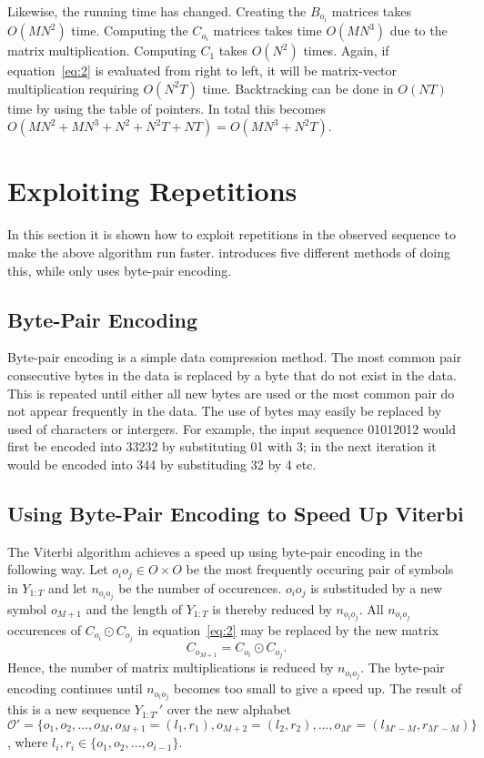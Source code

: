 Likewise, the running time has changed. Creating the $B_{o_i}$ matrices takes
$O(M N^2)$ time. Computing the $C_{o_i}$ matrices takes time $O(M N^3)$ due to
the matrix multiplication. Computing $C_1$ takes $O(N^2)$ times. Again, if
equation~\eqref{eq:2} is evaluated from right to left, it will be matrix-vector
multiplication requiring $O(N^2 T)$ time. Backtracking can be done in $O(NT)$
time by using the table of pointers. In total this becomes $O(M N^2 + M N^3 +
N^2 + N^2 T + NT) = O(M N^3 + N^2 T)$.

\section{Exploiting Repetitions}
\label{sec:expl-repet}

In this section it is shown how to exploit repetitions in the observed sequence
to make the above algorithm run faster. \citet{lifshits2009speeding} introduces
five different methods of doing this, while \citet{sand2013ziphmmlib} only uses
byte-pair encoding.

\subsection{Byte-Pair Encoding}
\label{sec:byte-pair-encoding}

Byte-pair encoding is a simple data compression method. The most common pair
consecutive bytes in the data is replaced by a byte that do not exist in the
data. This is repeated until either all new bytes are used or the most common
pair do not appear frequently in the data. The use of bytes may easily be
replaced by used of characters or intergers. For example, the input sequence
01012012 would first be encoded into 33232 by substituting 01 with 3; in the
next iteration it would be encoded into 344 by substituding 32 by 4 etc.

\subsection{Using Byte-Pair Encoding to Speed Up Viterbi}
\label{sec:using-byte-pair}

The Viterbi algorithm achieves a speed up using byte-pair encoding in the
following way. Let $o_i o_j \in O \times O$ be the most frequently occuring
pair of symbols in $Y_{1:T}$ and let $n_{o_i o_j}$ be the number of
occurences. $o_i o_j$ is substituded by a new symbol $o_{M + 1}$ and the length
of $Y_{1:T}$ is thereby reduced by $n_{o_i o_j}$. All $n_{o_i o_j}$ occurences
of $C_{o_i} \odot C_{o_j}$ in equation~\eqref{eq:2} may be replaced by the new
matrix
\begin{equation}
  C_{o_{M + 1}} = C_{o_i} \odot C_{o_j}.
\end{equation}
Hence, the number of matrix multiplications is reduced by $n_{o_i o_j}$. The
byte-pair encoding continues until $n_{o_i o_j}$ becomes too small to give a
speed up.  The result of this is a new sequence
$Y_{1:T'}'$ over the new alphabet
$\mathcal{O}' = \{o_1, o_2, \dots, o_M, o_{M + 1} = (l_1, r_1), o_{M + 2} =
(l_2, r_2), \dots, o_{M'} = (l_{M' - M}, r_{M' - M}) \}$,
where $l_i, r_i \in \{ o_1, o_2, \dots, o_{i - 1} \}$.

